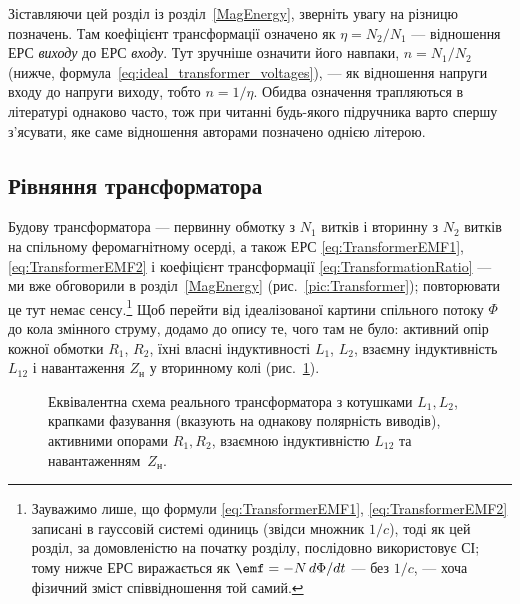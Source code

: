 \begin{Attention}
	Зіставляючи цей розділ із розділ~\ref{MagEnergy}, зверніть увагу
	на різницю позначень. Там коефіцієнт трансформації означено
	як $\eta = N_2/N_1$ --- відношення ЕРС \emph{виходу} до ЕРС
	\emph{входу}. Тут зручніше означити його навпаки, $n =
	N_1/N_2$ (нижче, формула~\eqref{eq:ideal_transformer_voltages}),
	--- як відношення напруги входу до напруги виходу, тобто
	$n = 1/\eta$. Обидва означення трапляються в літературі
	однаково часто, тож при читанні будь-якого підручника варто
	спершу з'ясувати, яке саме відношення авторами позначено
	однією літерою.
\end{Attention}

\subsection*{Рівняння трансформатора}

Будову трансформатора --- первинну обмотку з $N_1$ витків і
вторинну з $N_2$ витків на спільному феромагнітному осерді, а
також ЕРС \eqref{eq:TransformerEMF1}, \eqref{eq:TransformerEMF2}
і коефіцієнт трансформації \eqref{eq:TransformationRatio} --- ми
вже обговорили в розділ~\ref{MagEnergy} (рис.~\ref{pic:Transformer});
повторювати це тут немає сенсу.\footnote{Зауважимо лише, що
формули \eqref{eq:TransformerEMF1}, \eqref{eq:TransformerEMF2}
записані в гауссовій системі одиниць (звідси множник $1/c$), тоді
як цей розділ, за домовленістю на початку розділу, послідовно
використовує СІ; тому нижче ЕРС виражається як $\emf=-N\,d\Phi/dt$
--- без $1/c$, --- хоча фізичний зміст співвідношення той самий.}
Щоб перейти від ідеалізованої картини спільного потоку $\Phi$ до
кола змінного струму, додамо до опису те, чого там не було:
активний опір кожної обмотки $R_1$, $R_2$, їхні власні
індуктивності $L_1$, $L_2$, взаємну індуктивність $L_{12}$ і
навантаження $Z_{\text{н}}$ у вторинному колі (рис.~\ref{pic:transformer_circuit}).

\begin{figure}[h!]
	\centering
	\caption{Еквівалентна схема реального трансформатора з котушками $L_1, L_2$, крапками фазування (вказують на однакову полярність виводів), активними опорами $R_1, R_2$, взаємною індуктивністю $L_{12}$ та навантаженням~$Z_{\text{н}}$.}
	\label{pic:transformer_circuit}
\end{figure}

